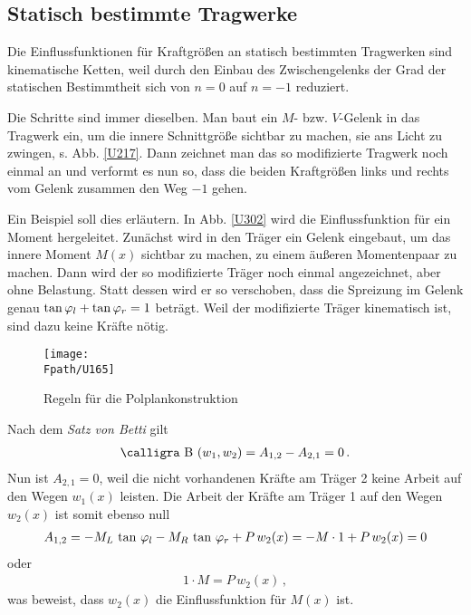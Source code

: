 {\textcolor{sectionTitleBlue}{\section{Statisch bestimmte Tragwerke}}}
Die Einflussfunktionen f\"{u}r Kraftgr\"{o}{\ss}en an statisch bestimmten Tragwerken sind kinematische Ketten, weil durch den Einbau des Zwischengelenks der Grad der statischen Bestimmtheit sich von $n = 0$ auf $n = -1$ reduziert.

Die Schritte sind immer dieselben. Man baut ein $M$- bzw. $V$-Gelenk in das Tragwerk ein, um die innere Schnittgr\"{o}{\ss}e sichtbar zu machen, \glq sie ans Licht zu zwingen\grq{}, s. Abb. \ref{U217}. Dann zeichnet man das so modifizierte Tragwerk noch einmal an und verformt es nun so, dass die beiden Kraftgr\"{o}{\ss}en links und rechts vom Gelenk zusammen den Weg $-1$ gehen.

Ein Beispiel soll dies erl\"{a}utern. In Abb. \ref{U302} wird die Einflussfunktion f\"{u}r ein Moment hergeleitet. Zun\"{a}chst wird in den Tr\"{a}ger ein Gelenk eingebaut, um das innere Moment $M(x)$ \glq sichtbar\grq{} zu machen, zu einem \"{a}u{\ss}eren Momentenpaar zu machen. Dann wird der so modifizierte Tr\"{a}ger noch einmal angezeichnet, aber ohne Belastung. Statt dessen wird er so verschoben, dass die Spreizung im Gelenk genau $\tan \varphi_l + \tan \varphi_r = 1$ betr\"{a}gt. Weil der modifizierte Tr\"{a}ger kinematisch ist, sind dazu keine Kr\"{a}fte n\"{o}tig.
\begin{figure}[tbp]
\centering
\if {} \sidecaption \fi
\texttt{[image: \\Fpath/U165]}
\caption{Regeln f\"{u}r die Polplankonstruktion} \label{U165}
\end{figure}%

Nach dem {\em Satz von Betti\/} gilt
\begin{align}
\text{\normalfont\calligra B\,\,}(w_1,w_2) = A_{1,2} - A_{2,1} = 0\,.
\end{align}
Nun ist $A_{2,1} = 0$, weil die nicht vorhandenen Kr\"{a}fte am Tr\"{a}ger 2 keine Arbeit auf den Wegen $w_1(x)$ leisten. Die Arbeit der Kr\"{a}fte am Tr\"{a}ger 1 auf den Wegen $w_2(x)$ ist somit ebenso null
\begin{align}
A_{1,2} = -M_L\,\tan\,\varphi_l - M_R\,\tan\,\varphi_r + P\,w_2(x) = - M \cdot 1 + P\,w_2(x) = 0
\end{align}
oder
\begin{align}
1 \cdot M = P\,w_2(x)\,,
\end{align}
was beweist, dass $w_2(x)$ die Einflussfunktion f\"{u}r $M(x)$ ist.\\

